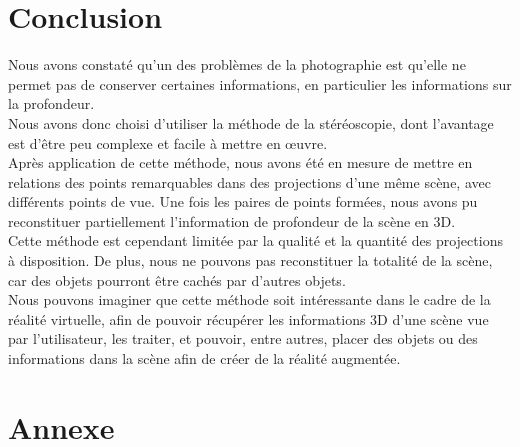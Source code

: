 \documentclass[a4paper]{article}
\begin{document}

\section{Conclusion}

Nous avons constaté qu'un des problèmes de la photographie est qu'elle ne permet pas de conserver certaines informations, en particulier les informations sur la profondeur.\\

Nous avons donc choisi d'utiliser la méthode de la stéréoscopie, dont l'avantage est d'être peu complexe et facile à mettre en œuvre.\\

Après application de cette méthode, nous avons été en mesure de mettre en relations des points remarquables dans des projections d'une même scène, avec différents points de vue. Une fois les paires de points formées, nous avons pu reconstituer partiellement l'information de profondeur de la scène en 3D.\\

Cette méthode est cependant limitée par la qualité et la quantité des projections à disposition. De plus, nous ne pouvons pas reconstituer la totalité de la scène, car des objets pourront être cachés par d'autres objets.\\

Nous pouvons imaginer que cette méthode soit intéressante dans le cadre de la réalité virtuelle, afin de pouvoir récupérer les informations 3D d'une scène vue par l'utilisateur, les traiter, et pouvoir, entre autres, placer des objets ou des informations dans la scène afin de créer de la réalité augmentée.\\

\clearpage

\section{Annexe}
\end{document}

